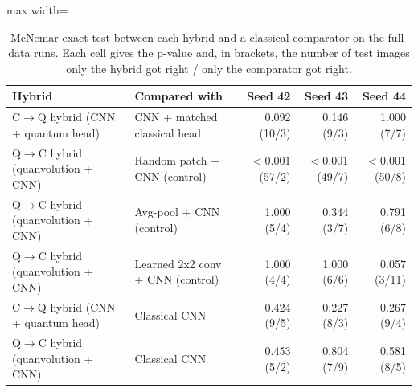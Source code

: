 \begin{table}[htbp]
\centering
\scriptsize
\caption{McNemar exact test between each hybrid and a classical comparator on the full-data runs. Each cell gives the p-value and, in brackets, the number of test images only the hybrid got right / only the comparator got right.}
\label{tab:mcnemar}
\begin{adjustbox}{max width=\linewidth}
\begin{tabular}{llrrr}
\toprule
Hybrid & Compared with & Seed 42 & Seed 43 & Seed 44 \\
\midrule
C$\rightarrow$Q hybrid (CNN + quantum head) & CNN + matched classical head & 0.092 (10/3) & 0.146 (9/3) & 1.000 (7/7) \\
Q$\rightarrow$C hybrid (quanvolution + CNN) & Random patch + CNN (control) & $<$0.001 (57/2) & $<$0.001 (49/7) & $<$0.001 (50/8) \\
Q$\rightarrow$C hybrid (quanvolution + CNN) & Avg-pool + CNN (control) & 1.000 (5/4) & 0.344 (3/7) & 0.791 (6/8) \\
Q$\rightarrow$C hybrid (quanvolution + CNN) & Learned 2x2 conv + CNN (control) & 1.000 (4/4) & 1.000 (6/6) & 0.057 (3/11) \\
C$\rightarrow$Q hybrid (CNN + quantum head) & Classical CNN & 0.424 (9/5) & 0.227 (8/3) & 0.267 (9/4) \\
Q$\rightarrow$C hybrid (quanvolution + CNN) & Classical CNN & 0.453 (5/2) & 0.804 (7/9) & 0.581 (8/5) \\
\bottomrule
\end{tabular}
\end{adjustbox}
\end{table}
